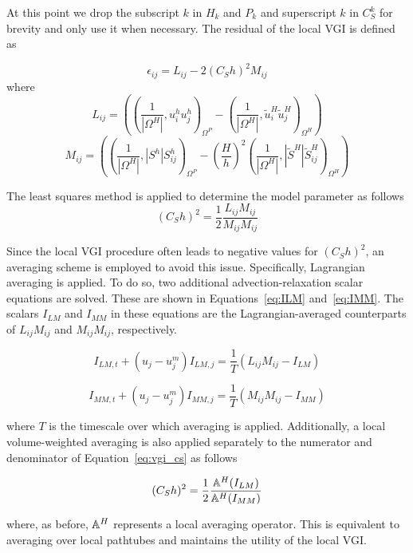 At this point we drop the subscript $k$ in $H_k$ and $P_k$ and superscript
$k$ in $C_S^k$ for brevity and only use it when necessary.
The residual of the local VGI is defined as

\begin{equation}
\label{eq:vgilres}
\epsilon_{ij} = L_{ij} - 2 (C_S h)^2 M_{ij}
\end{equation}
\noindent where
\begin{equation}
\label{eq:lij}
L_{ij} = \left(\left(\frac{1}{|\Omega^H|}, u^h_i u^h_j\right)_{\Omega^P} - \left(\frac{1}{|\Omega^H|}, \widetilde{u}^H_i \widetilde{u}^H_j\right)_{\Omega^H} \right)
\end{equation}
\begin{equation}
\label{eq:mij}
M_{ij} = \left(\left(\frac{1}{|\Omega^H|}, |S^h| S^h_{ij}\right)_{\Omega^P} - \left(\frac{H}{h}\right)^2\left(\frac{1}{|\Omega^H|}, |\widetilde{S}^H| \widetilde{S}^H_{ij}\right)_{\Omega^H} \right)
\end{equation}

The least squares method is applied to determine the model parameter as follows
\begin{equation}
\label{eq:vgi_cs}
(C_S h)^2 = \frac{1}{2}\frac{L_{ij}M_{ij}}{M_{ij}M_{ij}}
\end{equation}

Since the local VGI procedure often leads to negative values
for $(C_S h)^2$, an averaging scheme is employed to avoid this issue.
Specifically, Lagrangian averaging 
is applied\cite{bib:meneveau96}.
To do so, two additional advection-relaxation scalar equations are solved.
These are shown in Equations~\eqref{eq:ILM} and~\eqref{eq:IMM}.
The scalars $I_{LM}$ and $I_{MM}$ in these equations are the
Lagrangian-averaged counterparts of
$L_{ij} M_{ij}$ and $M_{ij} M_{ij}$, respectively.

\begin{equation}
\label{eq:ILM}
  I_{LM,t} + (u_j - u^m_j) I_{LM,j} = \frac{1}{T} (L_{ij}M_{ij} - I_{LM})
\end{equation}

\begin{equation}
\label{eq:IMM}
  I_{MM,t}+ (u_j - u^m_j) I_{MM,j} = \frac{1}{T} (M_{ij}M_{ij} - I_{MM})
\end{equation}

\noindent where $T$ is the timescale over which averaging is applied.
Additionally, a local volume-weighted averaging
is also applied separately to the numerator and denominator
of Equation~\eqref{eq:vgi_cs} as follows

\begin{equation}
\label{eq:CS_LDS}
  (C_S h)^2 = \frac{1}{2}\frac{\mathbb{A}^{H}(I_{LM})}{\mathbb{A}^{H}(I_{MM})}
\end{equation}

\noindent where, as before, $\mathbb{A}^{H}$ represents a local averaging operator.
This is equivalent to averaging over local pathtubes\cite{bib:tran2016,bib:tran2017b} and maintains the utility of the local VGI.

